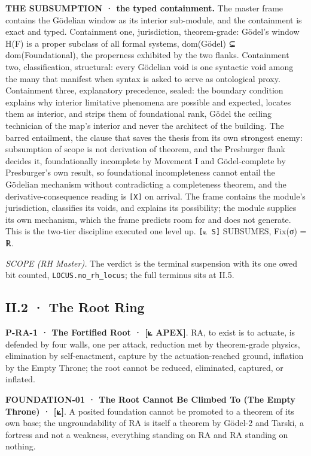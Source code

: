 \documentclass[10pt,twocolumn]{article}
\begin{document}
\textbf{THE SUBSUMPTION · the typed containment.} The master frame
contains the Gödelian window as its interior sub-module, and the
containment is exact and typed. Containment one, jurisdiction,
theorem-grade: Gödel's window H(F) is a proper subclass of all formal
systems, dom(Gödel) ⊊ dom(Foundational), the properness exhibited by the
two flanks. Containment two, classification, structural: every Gödelian
void is one syntactic void among the many that manifest when syntax is
asked to serve as ontological proxy. Containment three, explanatory
precedence, sealed: the boundary condition explains why interior
limitative phenomena are possible and expected, locates them as
interior, and strips them of foundational rank, Gödel the ceiling
technician of the map's interior and never the architect of the
building. The barred entailment, the clause that saves the thesis from
its own strongest enemy: subsumption of scope is not derivation of
theorem, and the Presburger flank decides it, foundationally incomplete
by Movement I and Gödel-complete by Presburger's own result, so
foundational incompleteness cannot entail the Gödelian mechanism without
contradicting a completeness theorem, and the derivative-consequence
reading is \texttt{{[}X{]}} on arrival. The frame contains the module's
jurisdiction, classifies its voids, and explains its possibility; the
module supplies its own mechanism, which the frame predicts room for and
does not generate. This is the two-tier discipline executed one level
up. \texttt{{[}⟀\ S{]}} SUBSUMES, Fix(σ) = ℝ.

\emph{SCOPE (RH Master).} The verdict is the terminal suspension with
its one owed bit counted, \texttt{LOCUS.no\_rh\_locus}; the full
terminus sits at II.5.

\hypertarget{ii.2-the-root-ring}{%
\subsection{II.2 · The Root Ring}\label{ii.2-the-root-ring}}

\textbf{P-RA-1 · The Fortified Root · {[}⟀ APEX{]}}. RA, to exist is to
actuate, is defended by four walls, one per attack, reduction met by
theorem-grade physics, elimination by self-enactment, capture by the
actuation-reached ground, inflation by the Empty Throne; the root cannot
be reduced, eliminated, captured, or inflated.

\textbf{FOUNDATION-01 · The Root Cannot Be Climbed To (The Empty Throne)
· {[}⟀{]}}. A posited foundation cannot be promoted to a theorem of its
own base; the ungroundability of RA is itself a theorem by Gödel-2 and
Tarski, a fortress and not a weakness, everything standing on RA and RA
standing on nothing.
\end{document}
